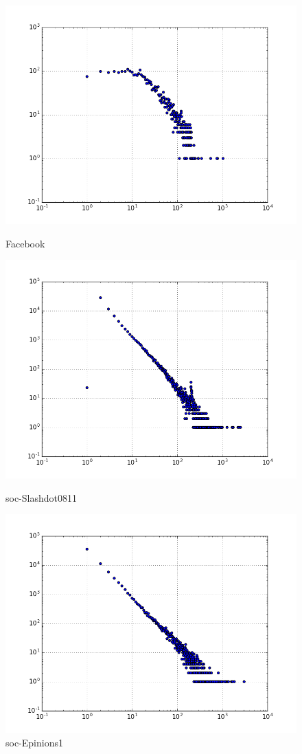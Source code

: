 \begin{figure}[H]
  \includegraphics[width=\linewidth]{img/facebook/degree_dist.png}
  \caption*{Facebook}
\endminipage\hfill
{}
  \includegraphics[width=\linewidth]{img/slashDot/degree_dist.png}
  \caption*{soc-Slashdot0811}
\endminipage\hfill
{}
  \includegraphics[width=\linewidth]{img/soc-E/degree_dist.png}
  \caption*{soc-Epinions1}
\endminipage
\end{figure}

